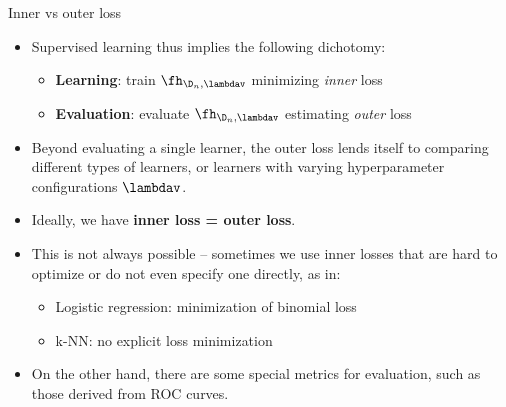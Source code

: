 \documentclass[11pt,compress,t,notes=noshow, xcolor=table]{beamer}
\begin{document}
\begin{vbframe}{Inner vs outer loss}

\begin{itemize}
  \item Supervised learning thus implies the following dichotomy:
  \begin{itemize}
    \item \textbf{Learning}: train $\fh_{\D_n, \lambdav}$ minimizing 
    \textit{inner} loss
    \item \textbf{Evaluation}: evaluate $\fh_{\D_n, \lambdav}$ estimating
    \textit{outer} loss
  \end{itemize}
  \item Beyond evaluating a single learner, the outer loss lends itself to
  comparing different types of learners, or learners with varying hyperparameter
  configurations $\lambdav$.
\end{itemize}

\lz

\begin{itemize}
  \item Ideally, we have \textbf{inner loss = outer loss}.
  \item This is not always possible -- sometimes we use inner losses that are 
  hard to optimize or do not even specify one directly, as in:
  \begin{itemize}
    \item Logistic regression: minimization of binomial loss
    \item k-NN: no explicit loss minimization
  \end{itemize}
  \item On the other hand, there are some special metrics for evaluation,
  such as those derived from ROC curves.
\end{itemize}

\end{vbframe}

\end{document}
